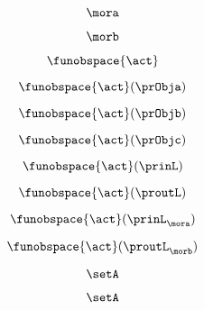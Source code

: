 \begin{forslides}
    \begin{equation}
        \label{eq:slides-processes-55}
        \mora
    \end{equation}

    \begin{equation}
        \label{eq:slides-processes-56}
        \morb
    \end{equation}

    \begin{equation}
        \label{eq:slides-processes-57}
         \funobspace{\act}
    \end{equation}

    \begin{equation}
        \label{eq:slides-processes-58}
        \funobspace{\act} (\prObja)
    \end{equation}

    \begin{equation}
        \label{eq:slides-processes-59}
        \funobspace{\act} (\prObjb)
    \end{equation}

    \begin{equation}
        \label{eq:slides-processes-60}
        \funobspace{\act} (\prObjc)
    \end{equation}

    \begin{equation}
        \label{eq:slides-processes-61}
        \funobspace{\act} (\prinL)
    \end{equation}

    \begin{equation}
        \label{eq:slides-processes-62}
        \funobspace{\act} (\proutL)
    \end{equation}

    \begin{equation}
        \label{eq:slides-processes-63}
        \funobspace{\act} (\prinL_\mora)
    \end{equation}

    \begin{equation}
        \label{eq:slides-processes-64}
        \funobspace{\act} (\proutL_\morb)
    \end{equation}

    \begin{equation}
        \label{eq:slides-processes-65}
        \setA
    \end{equation}

    \begin{equation}
        \label{eq:slides-processes-66}
        \setA
    \end{equation}


\end{forslides}
